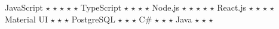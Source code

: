 \begin{cvhonors}
  \cvhonor
    {JavaScript}
    { $\star$ $\star$ $\star$ $\star$ $\star$}
    {}
    {}
  \cvhonor
    {TypeScript }
    {$\star$ $\star$ $\star$ $\star$}
    {}
    {}
  \cvhonor
    {Node.js }
    {$\star$ $\star$ $\star$ $\star$ $\star$}
    {}
    {} 
  \cvhonor
    {React.js }
    {$\star$ $\star$ $\star$ $\star$}
    {}
    {} 
  \cvhonor
    {Material UI }
    {$\star$ $\star$ $\star$ }
    {}
    {}
  \cvhonor
    {PostgreSQL}
    {$\star$ $\star$ $\star$ }
    {}
    {}  
  \cvhonor
    {C\#}
    {$\star$ $\star$ $\star$ }
    {}
    {}  
  \cvhonor
    {Java}
    {$\star$ $\star$ $\star$ }
    {}
    {}      
\end{cvhonors}
